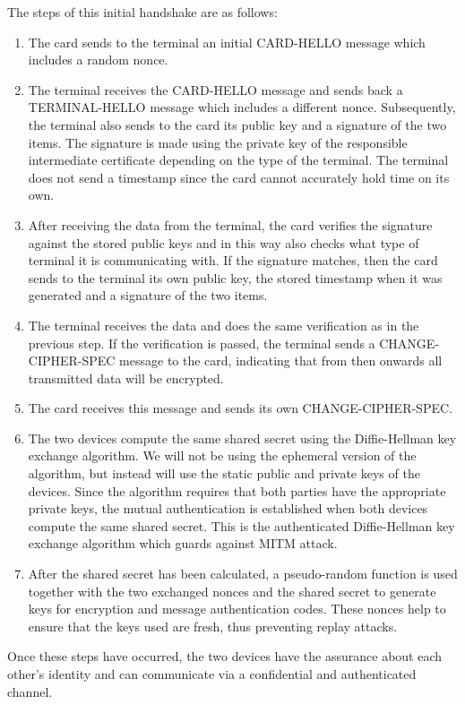 The steps of this initial handshake are as follows:
\begin{enumerate}
 \item The card sends to the terminal an initial CARD-HELLO message which includes a random nonce.
 \item The terminal receives the CARD-HELLO message and sends back a TERMINAL-HELLO message which includes a different nonce. Subsequently, the terminal also sends to the card its public key and a signature of the two items. The signature is made using the private key of the responsible intermediate certificate depending on the type of the terminal. The terminal does not send a timestamp since the card cannot accurately hold time on its own.
 \item After receiving the data from the terminal, the card verifies the signature against the stored public keys and in this way also checks what type of terminal it is communicating with. If the signature matches, then the card sends to the terminal its own public key, the stored timestamp when it was generated and a signature of the two items.
 \item The terminal receives the data and does the same verification as in the previous step. If the verification is passed, the terminal sends a CHANGE-CIPHER-SPEC message to the card, indicating that from then onwards all transmitted data will be encrypted.
 \item The card receives this message and sends its own CHANGE-CIPHER-SPEC.
 \item The two devices compute the same shared secret using the Diffie-Hellman key exchange algorithm. We will not be using the ephemeral version of the algorithm, but instead will use the static public and private keys of the devices. Since the algorithm requires that both parties have the appropriate private keys, the mutual authentication is established when both devices compute the same shared secret. This is the authenticated Diffie-Hellman key exchange algorithm which guards against MITM attack.
 \item After the shared secret has been calculated, a pseudo-random function is used together with the two exchanged nonces and the shared secret to generate keys for encryption and message authentication codes. These nonces help to ensure that the keys used are fresh, thus preventing replay attacks.
\end{enumerate}

Once these steps have occurred, the two devices have the assurance about each other's identity and can communicate via a confidential and authenticated channel.